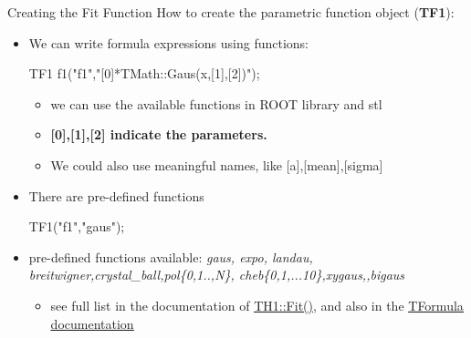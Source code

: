 \documentclass[aspectratio=169]{beamer}
\newcommand{\myhref}[2]{{\color{blue}\href{#1}{\underline{#2}}}}
\begin{document}
\begin{frame}[fragile]{Creating the Fit Function}
    How to create the parametric function object (\textbf{TF1}):
    \begin{itemize}
        \item We can write formula expressions using functions:
            \begin{myterminal}
TF1 f1("f1","[0]*TMath::Gaus(x,[1],[2])");
            \end{myterminal}
        \begin{itemize}
            \item we can use the available functions in ROOT library and stl
            \item \textbf{[0],[1],[2] indicate the parameters.}
            \item We could also use meaningful names, like [a],[mean],[sigma]
        \end{itemize}
        \item There are pre-defined functions
            \begin{myterminal}
TF1("f1","gaus");
            \end{myterminal}
        \item pre-defined functions available: \textit{gaus, expo, landau, breitwigner,crystal\_ball,pol\{0,1..,N\}, cheb\{0,1,...10\},xygaus,,bigaus}
        \begin{itemize}
            \item see full list in the documentation of \myhref{https://root.cern.ch/doc/master/classTH1.html\#a63eb028df86bc86c8e20c989eb23fb2a}{TH1::Fit()}, and also in the \myhref{https://root.cern.ch/doc/master/classTFormula.html\#FormulaFuncs}{TFormula documentation}
        \end{itemize}

    \end{itemize}
\end{frame}
\end{document}
